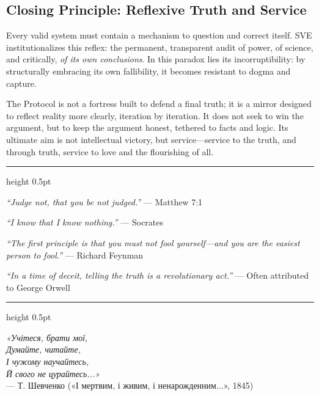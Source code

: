 \documentclass[11pt,a4paper]{article}
\begin{document}
\begin{small}
\vspace{1.5em}

\subsection*{\textcolor{headercolor}{Closing Principle: Reflexive Truth and Service}}

Every valid system must contain a mechanism to question and correct itself. SVE institutionalizes this reflex: the permanent, transparent audit of power, of science, and critically, \textit{of its own conclusions}. In this paradox lies its incorruptibility: by structurally embracing its own fallibility, it becomes resistant to dogma and capture.

The Protocol is not a fortress built to defend a final truth; it is a mirror designed to reflect reality more clearly, iteration by iteration. It does not seek to win the argument, but to keep the argument honest, tethered to facts and logic. Its ultimate aim is not intellectual victory, but service—service to the truth, and through truth, service to love and the flourishing of all.

\vspace{2em}

\begin{center}
\begin{minipage}{0.9\textwidth}
\hrule height 0.5pt
\vspace{1em}

\noindent\textit{``Judge not, that you be not judged.''} --- Matthew 7:1

\vspace{0.6em}
\noindent\textit{``I know that I know nothing.''} --- Socrates

\vspace{0.6em}
\noindent\textit{``The first principle is that you must not fool yourself—and you are the easiest person to fool.''} --- Richard Feynman

\vspace{0.6em}
\noindent\textit{``In a time of deceit, telling the truth is a revolutionary act.''} --- Often attributed to George Orwell

\vspace{1em}
\hrule height 0.5pt
\vspace{1em}

{\selectfont
\noindent\textit{«Учітеся, брати мої,\\
Думайте, читайте,\\
І чужому научайтесь,\\
Й свого не цурайтесь...»}\\
--- Т. Шевченко («І мертвим, і живим, і ненарожденним...», 1845)

}
\end{minipage}
\end{center}
\end{small}
\end{document}
